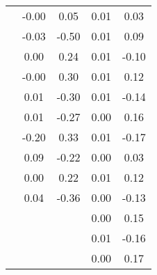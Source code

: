 \begin{table}
\begin{tabular}{c|cc|cc|}
\multicolumn{1}{|c|}{} & \multicolumn{1}{|c|}{     -0.00} & \multicolumn{1}{|c|}{      0.05} & \multicolumn{1}{|c|}{      0.01} & \multicolumn{1}{|c|}{      0.03} \\ 
\multicolumn{1}{|c|}{} & \multicolumn{1}{|c|}{     -0.03} & \multicolumn{1}{|c|}{     -0.50} & \multicolumn{1}{|c|}{      0.01} & \multicolumn{1}{|c|}{      0.09} \\ 
\multicolumn{1}{|c|}{} & \multicolumn{1}{|c|}{      0.00} & \multicolumn{1}{|c|}{      0.24} & \multicolumn{1}{|c|}{      0.01} & \multicolumn{1}{|c|}{     -0.10} \\ 
\multicolumn{1}{|c|}{} & \multicolumn{1}{|c|}{     -0.00} & \multicolumn{1}{|c|}{      0.30} & \multicolumn{1}{|c|}{      0.01} & \multicolumn{1}{|c|}{      0.12} \\ 
\multicolumn{1}{|c|}{} & \multicolumn{1}{|c|}{      0.01} & \multicolumn{1}{|c|}{     -0.30} & \multicolumn{1}{|c|}{      0.01} & \multicolumn{1}{|c|}{     -0.14} \\ 
\multicolumn{1}{|c|}{} & \multicolumn{1}{|c|}{      0.01} & \multicolumn{1}{|c|}{     -0.27} & \multicolumn{1}{|c|}{      0.00} & \multicolumn{1}{|c|}{      0.16} \\ 
\multicolumn{1}{|c|}{} & \multicolumn{1}{|c|}{     -0.20} & \multicolumn{1}{|c|}{      0.33} & \multicolumn{1}{|c|}{      0.01} & \multicolumn{1}{|c|}{     -0.17} \\ 
\multicolumn{1}{|c|}{} & \multicolumn{1}{|c|}{      0.09} & \multicolumn{1}{|c|}{     -0.22} & \multicolumn{1}{|c|}{      0.00} & \multicolumn{1}{|c|}{      0.03} \\ 
\multicolumn{1}{|c|}{} & \multicolumn{1}{|c|}{      0.00} & \multicolumn{1}{|c|}{      0.22} & \multicolumn{1}{|c|}{      0.01} & \multicolumn{1}{|c|}{      0.12} \\ 
\multicolumn{1}{|c|}{} & \multicolumn{1}{|c|}{      0.04} & \multicolumn{1}{|c|}{     -0.36} & \multicolumn{1}{|c|}{      0.00} & \multicolumn{1}{|c|}{     -0.13} \\ 
\multicolumn{1}{|c|}{} & \multicolumn{1}{|c|}{} & \multicolumn{1}{|c|}{} & \multicolumn{1}{|c|}{      0.00} & \multicolumn{1}{|c|}{      0.15} \\ 
\multicolumn{1}{|c|}{} & \multicolumn{1}{|c|}{} & \multicolumn{1}{|c|}{} & \multicolumn{1}{|c|}{      0.01} & \multicolumn{1}{|c|}{     -0.16} \\ 
\multicolumn{1}{|c|}{} & \multicolumn{1}{|c|}{} & \multicolumn{1}{|c|}{} & \multicolumn{1}{|c|}{      0.00} & \multicolumn{1}{|c|}{      0.17} \\ 

\end{tabular}
\end{table}

